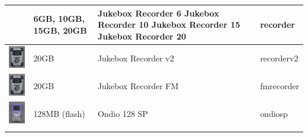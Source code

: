 \begin{center}
\begin{tabularx}{\textwidth}{llXl}
\begin{minipage}{2.2cm}
    \end{minipage}
    & 6GB, 10GB, 15GB, 20GB & \begin{minipage}{8cm}
                              Jukebox Recorder 6 \newline
                              Jukebox Recorder 10 \newline
                              Jukebox Recorder 15 \newline
                              Jukebox Recorder 20 
                              \end{minipage}
                               & recorder\\\midrule
    \begin{minipage}{2.2cm}
      \includegraphics[width=2cm]{getting_started/images/archos-recorderv2-small.png}
    \end{minipage}
                     & 20GB & Jukebox Recorder v2 & recorderv2\\\midrule
    \begin{minipage}{2.2cm}
      \includegraphics[width=2cm]{getting_started/images/archos-recorderfm-small.png}
    \end{minipage}
                     & 20GB & Jukebox Recorder FM & fmrecorder \\\midrule
    \begin{minipage}{2.2cm}
      \includegraphics[width=2cm]{getting_started/images/archos-ondiosp-small.png}
    \end{minipage}
                     & 128MB (flash) & Ondio 128 SP & ondiosp \\\midrule
    \begin{minipage}{2.2cm}

\end{minipage}
\end{tabularx}
\end{center}
